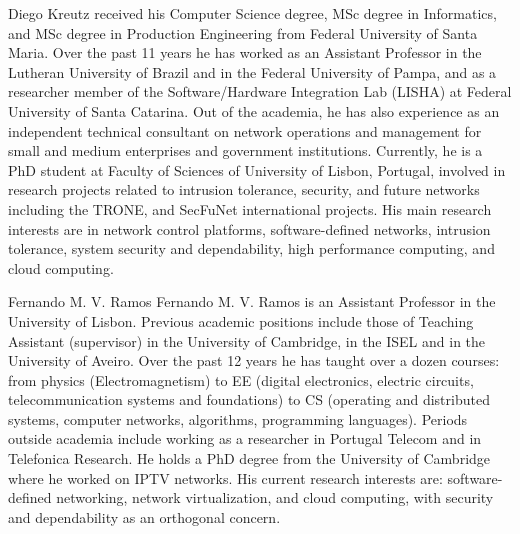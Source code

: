 \documentclass[journal]{IEEEtran}
\begin{document}
\begin{IEEEbiographynophoto}{Diego Kreutz}
received his Computer Science degree, MSc degree in Informatics, and MSc degree in Production Engineering from Federal University of Santa Maria.
Over the past 11 years he has worked as an Assistant Professor in the Lutheran University of Brazil and in the Federal University of Pampa, and as a researcher member of the Software/Hardware Integration Lab (LISHA) at Federal University of Santa Catarina.
Out of the academia, he has also experience as an independent technical consultant on network operations and management for small and medium enterprises and government institutions.
Currently, he is a PhD student at Faculty of Sciences of University of Lisbon, Portugal, involved in research projects related to intrusion tolerance, security, and future networks including the TRONE, and SecFuNet international projects. 
His main research interests are in network control platforms, software-defined networks, intrusion tolerance, system security and dependability, high performance computing, and cloud computing. 
\end{IEEEbiographynophoto}

\begin{IEEEbiographynophoto}{Fernando M. V. Ramos}
Fernando M. V. Ramos is an Assistant Professor in the University of Lisbon. Previous academic positions include  those of Teaching Assistant (supervisor) in the University of Cambridge, in the ISEL and in the University of Aveiro. Over the past 12 years he has taught over a dozen courses: from physics (Electromagnetism) to EE (digital electronics, electric circuits, telecommunication systems and foundations) to CS (operating and distributed systems, computer networks, algorithms, programming languages).
Periods outside academia include working as a researcher in Portugal Telecom and in Telefonica Research.
He holds a PhD degree from the University of Cambridge where he worked on IPTV networks.
His current research interests are: software-defined networking, network virtualization, and cloud computing, with security and dependability as an orthogonal concern.
\end{IEEEbiographynophoto}

\end{document}
